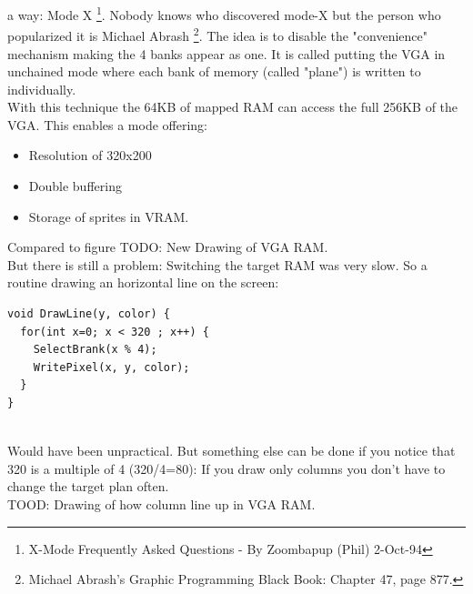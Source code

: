 a way: Mode X \footnote{X-Mode Frequently Asked Questions - By Zoombapup (Phil)  2-Oct-94}. Nobody knows who discovered mode-X but the person who popularized it is Michael Abrash \footnote{Michael Abrash's Graphic Programming Black Book: Chapter 47, page 877.}. The idea is to disable the "convenience" mechanism making the 4 banks appear as one. It is called putting the VGA in unchained mode where each bank of memory (called "plane") is written to individually.\\
With this technique the 64KB of mapped RAM can access the full 256KB of the VGA. This enables a mode offering:
\begin{itemize}
	\item Resolution of 320x200
	\item Double buffering
	\item Storage of sprites in VRAM.
\end{itemize}

Compared to figure 
TODO: New Drawing of VGA RAM.\\
But there is still a problem: Switching the target RAM was very slow. So a routine drawing an horizontal line on the screen:

\begin{verbatim}
void DrawLine(y, color) {
  for(int x=0; x < 320 ; x++) {
    SelectBrank(x % 4);
    WritePixel(x, y, color);   
  }
}
\end{verbatim}\\
Would have been unpractical. But something else can be done if you notice that 320 is a multiple of 4 (320/4=80): If you draw only columns you don't have to change the target plan often.\\
TOOD: Drawing of how column line up in VGA RAM.\\





